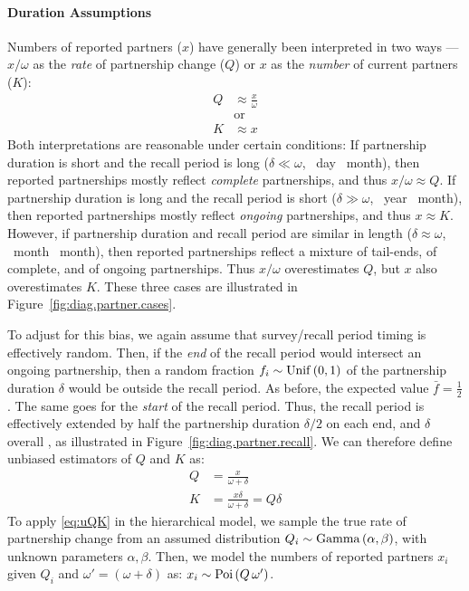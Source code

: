 \paragraph{Duration Assumptions}
Numbers of reported partners ($x$) have generally been interpreted in two ways ---
$x/\omega$ as the \emph{rate} of partnership change ($Q$) or
$x$ as the \emph{number} of current partners ($K$):
\begin{subequations}\label{eq:bQK}
\begin{alignat}{1}
  Q &\approx \frac{x}{\omega} \label{eq:bQ}\\
    &\text{or} \nonumber\\
  K &\approx x \label{eq:bK}
\end{alignat}
\end{subequations}
Both interpretations are reasonable under certain conditions:
If partnership duration is short and the recall period is long
($\delta \ll \omega$, ~day ~month),
then reported partnerships mostly reflect \emph{complete} partnerships,
and thus $x/\omega \approx Q$.
If partnership duration is long and the recall period is short
($\delta \gg \omega$, ~year ~month),
then reported partnerships mostly reflect \emph{ongoing} partnerships,
and thus $x \approx K$.
However, if partnership duration and recall period are similar in length
($\delta \approx \omega$, ~month ~month),
then reported partnerships reflect a mixture of tail-ends, of complete, and of ongoing partnerships.
Thus $x/\omega$ overestimates $Q$, but $x$ also overestimates $K$.
These three cases are illustrated in Figure~\ref{fig:diag.partner.cases}.
\par
To adjust for this bias, we again assume that survey/recall period timing is effectively random.
Then, if the \emph{end} of the recall period would intersect an ongoing partnership,
then a random fraction $f_i \sim \mathrm{Unif}\,(0,1)$ of the partnership duration $\delta$
would be outside the recall period.
As before, the expected value $\bar{f} = \frac12$.
The same goes for the \emph{start} of the recall period.
Thus, the recall period is effectively extended by
half the partnership duration $\delta/2$ on each end, and $\delta$ overall \cite{Neely2023},
as illustrated in Figure~\ref{fig:diag.partner.recall}.
We can therefore define unbiased estimators of $Q$ and $K$ as:
\begin{subequations}\label{eq:uQK}
\begin{alignat}{1}
  Q &= \frac{x}{\omega + \delta}\\
  K &= \frac{x \delta}{\omega + \delta} = Q \delta
\end{alignat}
\end{subequations}
To apply \eqref{eq:uQK} in the hierarchical model, we sample the true rate of partnership change
from an assumed distribution $Q_i \sim \mathrm{Gamma}\,(\alpha,\beta)$,
with unknown parameters $\alpha, \beta$.
Then, we model the numbers of reported partners $x_i$
given $Q_i$ and $\omega' = (\omega + \delta)$ as: $x_i \sim \mathrm{Poi}\,(Q\,\omega')$.
